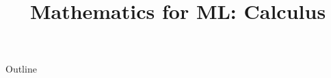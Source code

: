 \documentclass[xcolor=dvipsnames,compress,t,pdf,9pt]{beamer}
\title[\insertframenumber /\inserttotalframenumber]{Mathematics for ML: Calculus}
\begin{document}
	\begin{frame}
	\titlepage
	\end{frame}

	\begin{frame}{Outline}
	    \tableofcontents
	\end{frame}

	
	
	
	
\end{document}
